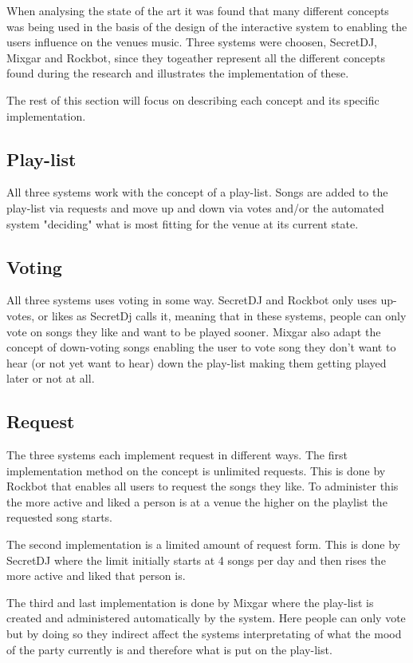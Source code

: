 When analysing the state of the art it was found that many different concepts was being used in the basis of the design of the interactive system to enabling the users influence on the venues music. Three systems were choosen, SecretDJ, Mixgar and Rockbot, since they togeather represent all the different concepts found during the research and illustrates the implementation of these.

The rest of this section will focus on describing each concept and its specific implementation.

\subsection{Play-list}
All three systems work with the concept of a play-list. Songs are added to the play-list via requests and move up and down via votes and/or the automated system "deciding" what is most fitting for the venue at its current state.

\subsection{Voting}
All three systems uses voting in some way. SecretDJ and Rockbot only uses up-votes, or likes as SecretDj calls it, meaning that in these systems, people can only vote on songs they like and want to be played sooner. Mixgar also adapt the concept of down-voting songs enabling the user to vote song they don't want to hear (or not yet want to hear) down the play-list making them getting played later or not at all.

\subsection{Request}
The three systems each implement request in different ways. The first implementation method on the concept is unlimited requests. This is done by Rockbot that enables all users to request the songs they like. To administer this the more active and liked a person is at a venue the higher on the playlist the requested song starts.


The second implementation is a limited amount of request form. This is done by SecretDJ where the limit initially starts at 4 songs per day and then rises the more active and liked that person is.


The third and last implementation is done by Mixgar where the play-list is created and administered automatically by the system. Here people can only vote but by doing so they indirect affect the systems interpretating of what the mood of the party currently is and therefore what is put on the play-list.

